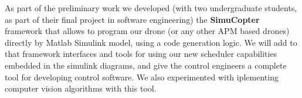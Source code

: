 \documentclass[11pt]{article}
\begin{document}
As part of the preliminary work we developed (with two undergraduate students, as part of their final project in software engineering) the \textbf{SimuCopter}~\cite{SimuCopter} framework that allows to program our drone  (or any other APM based drones) directly by Matlab Simulink model, using a code generation logic.
We will add to that framework interfaces and tools for using our new scheduler capabilities embedded in the simulink diagrams, and give the control engineers a complete tool for developing control software. We also experimented with iplementing computer vision algorithms with this tool.


    
    {}
\end{document}

